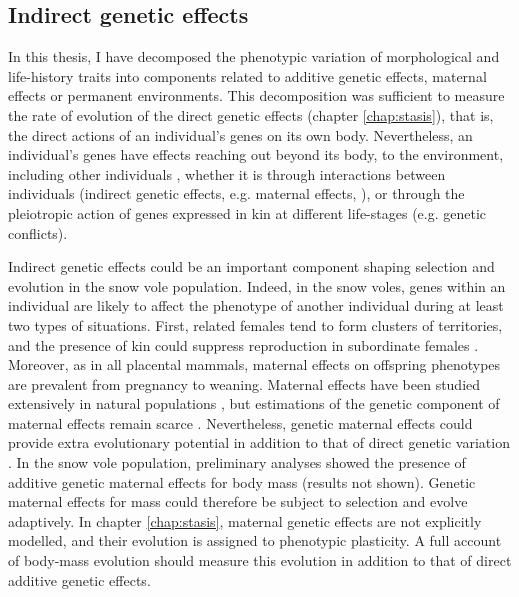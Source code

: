 \subsection{Indirect genetic effects}
In this thesis, I have decomposed the phenotypic variation of morphological and life-history traits into components related to additive genetic effects, maternal effects or permanent environments. This decomposition was sufficient to measure the rate of evolution of the direct genetic effects (chapter \ref{chap:stasis}), that is, the direct actions of an individual's genes on its own body.
Nevertheless, an individual's genes have effects reaching out beyond its body, to the environment, including other individuals \parencite{Dawkins1982}, whether it is through interactions between individuals (indirect genetic effects, e.g. maternal effects, \cite{McAdam2014}), or through the pleiotropic action of genes expressed in kin at different life-stages (e.g. genetic conflicts).

Indirect genetic effects could be an important component shaping selection and evolution in the snow vole population. Indeed, in the snow voles, genes within an individual are likely to affect the phenotype of another individual during at least two types of situations. First, related females tend to form clusters of territories, and the presence of kin could suppress reproduction in subordinate females \parencite{Garcia-Navas2016}. Moreover, as in all placental mammals, maternal effects on offspring phenotypes are prevalent from pregnancy to weaning. 
Maternal effects have been studied extensively in natural populations \parencite{Wolf2009}, but estimations of the genetic component of maternal effects remain scarce \parencite{McAdam2014}. Nevertheless, genetic maternal effects could provide extra evolutionary potential in addition to that of direct genetic variation \parencite{Mcglothlin2014, McAdam2014, Mcfarlane2015}. In the snow vole population, preliminary analyses showed the presence of additive genetic maternal effects for body mass (results not shown). Genetic maternal effects for mass could therefore be subject to selection and evolve adaptively. In chapter \ref{chap:stasis}, maternal genetic effects are not explicitly modelled, and their evolution is assigned to phenotypic plasticity. A full account of body-mass evolution should measure this evolution in addition to that of direct additive genetic effects. 

